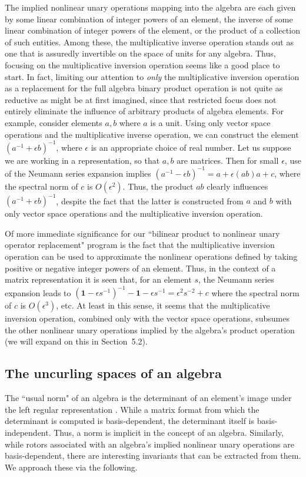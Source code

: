 \documentclass{amsart}
\numberwithin{equation}{section}
\theoremstyle{definition}
\numberwithin{theorem}{section}
\begin{document}
The implied nonlinear unary operations mapping into the algebra are each given by some linear combination of integer powers of an element, the inverse of some linear combination of integer powers of the element, or the product of a collection of such entities.  Among these, the multiplicative inverse operation stands out as one that is assuredly invertible on the space of units for any algebra.   Thus, focusing on the multiplicative inversion operation seems like a good place to start.  In fact, limiting our attention to {\it only} the multiplicative inversion operation as a replacement for the full algebra binary product operation is not quite as reductive as might be at first imagined, since that restricted focus does not entirely eliminate the influence of arbitrary products of algebra elements.  For example, consider elements $a,b$ where $a$ is a unit.  Using only vector space operations and the multiplicative inverse operation, we can construct the element $(a^{-1}+\epsilon b)^{-1}$, where $\epsilon$ is an appropriate choice of real number.  Let us suppose we are working in a representation, so that $a,b$ are matrices.  Then for small $\epsilon$, use of the \mbox{Neumann} series expansion implies $(a^{-1}-\epsilon b)^{-1} = a+\epsilon(ab)a+c$, where the spectral norm of $c$ is $O(\epsilon^2)$.  Thus, the product $ab$ clearly influences $(a^{-1}+\epsilon b)^{-1}$, despite the fact that the latter is constructed from $a$ and $b$ with only vector space operations and the multiplicative inversion operation.  

Of more immediate significance for our ``bilinear product to nonlinear unary operator replacement" program is the fact that the multiplicative inversion operation can be used to approximate the nonlinear operations defined by taking positive or negative integer powers of an element.  Thus, in the context of a matrix representation it is seen that, for an element $s$, the Neumann series expansion leads to \mbox{$(\mathbf{1}-\epsilon s^{- 1})^{-1} - \mathbf{1}- \epsilon s^{-1} = \epsilon^2 s^{-2} + c$} where the spectral norm of $c$ is $O(\epsilon^3)$, etc.  At least in this sense, it seems that the multiplicative inversion operation, combined only with the vector space operations, subsumes the other nonlinear unary operations implied by the algebra's product operation (we will expand on this in \mbox{Section 5.2}).  
 
      \subsection{The uncurling spaces of an algebra} The ``usual norm" of an algebra is the determinant of an element's image under the left regular representation \cite{bourbaki:1989}.  While a matrix format from which the determinant is computed is basis-dependent, the determinant itself is basis-independent.  Thus, a norm is implicit in the concept of an algebra.  Similarly, while rotors associated with an algebra's implied nonlinear unary operations are basis-dependent, there are interesting invariants that can be extracted from them.  We approach these via the following.
      
\end{document}
